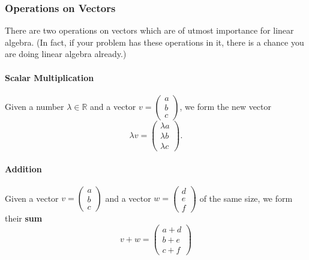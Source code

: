 \documentclass[10pt,]{book}
\newcommand{\terminology}[1]{\textbf{#1}}
\theoremstyle{plain}
\theoremstyle{definition}
\numberwithin{equation}{section}
\begin{document}
\typeout{************************************************}
\typeout{************************************************}
\subsubsection[Operations on Vectors]{Operations on Vectors}\label{subsubsection-1}
There are two operations on vectors which are of utmost importance for linear algebra. (In fact, if your problem has these operations in it, there is a chance you are doing linear algebra already.)%
\typeout{************************************************}
\typeout{************************************************}
\paragraph[Scalar Multiplication]{Scalar Multiplication}\label{paragraph-1}
Given a number \(\lambda \in \mathbb{R}\) and a vector \(v = \left(\begin{smallmatrix} a \\ b \\ c \end{smallmatrix}\right)\), we form the new vector \[\lambda v = \left(\begin{smallmatrix} \lambda a \\ \lambda b \\ \lambda c \end{smallmatrix}\right).\]%
\typeout{************************************************}
\typeout{************************************************}
\paragraph[Addition]{Addition}\label{paragraph-2}
Given a vector \(v = \left(\begin{smallmatrix} a \\ b \\ c \end{smallmatrix}\right)\) and a vector \(w = \left(\begin{smallmatrix} d \\ e \\ f \end{smallmatrix}\right)\) of the same size, we form their \terminology{sum} \[ v+w = \left(\begin{smallmatrix} a+d \\ b+e \\ c+f \end{smallmatrix}\right) \]%
\typeout{************************************************}
\typeout{************************************************}
\end{document}
